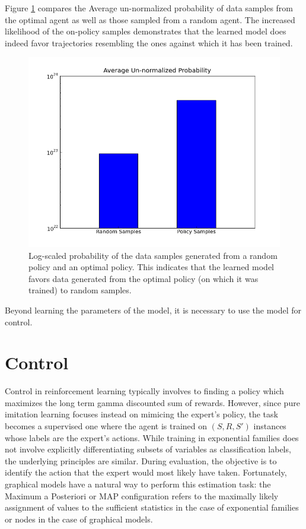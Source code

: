\documentclass{article} %
\begin{document}
Figure \ref{fig:learning} compares the Average un-normalized probability of data samples from the optimal agent as well as those sampled from a random agent. The increased likelihood of the on-policy samples demonstrates that the learned model does indeed favor trajectories resembling the ones against which it has been trained.

\begin{figure}[htp]
  \centering
  \includegraphics[width=.8\textwidth]{figures/graph.png}
  \caption{Log-scaled probability of the data samples generated from a random policy and an optimal policy. This indicates that the learned model favors data generated from the optimal policy (on which it was trained) to random samples.}
  \label{fig:learning}
\end{figure}

Beyond learning the parameters of the model, it is necessary to use the model for control.

\section{Control}

Control in reinforcement learning typically involves to finding a policy which maximizes the long term gamma discounted sum of rewards. However, since pure imitation learning focuses instead on mimicing the expert's policy, the task becomes a supervised one where the agent is trained on $(S,R,S')$ instances whose labels are the expert's actions. While training in exponential families does not involve explicitly differentiating subsets of variables as classification labels, the underlying principles are similar. During evaluation, the objective is to identify the action that the expert would most likely have taken. Fortunately, graphical models have a natural way to perform this estimation task: the Maximum a Posteriori or MAP configuration refers to the maximally likely assignment of values to the sufficient statistics in the case of exponential families or nodes in the case of graphical models.
\end{document}
